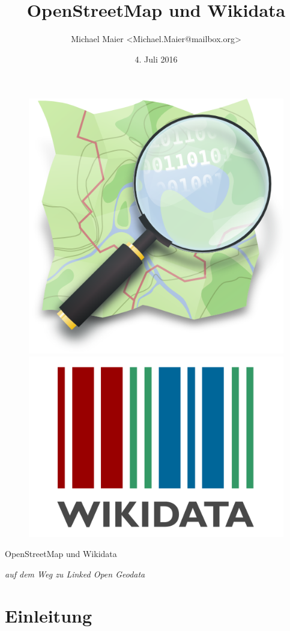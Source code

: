 \documentclass{beamer}
\title{OpenStreetMap und Wikidata}
\author{Michael Maier \textless Michael.Maier@mailbox.org\textgreater}
\date{4. Juli 2016}
\begin{document}

\begin{frame} 


\begin{figure}
  \centering
  \includegraphics[width=.4\textwidth]{mag_map.png}\includegraphics[width=.5\textwidth]{Wikidata-logo-en.pdf}
\end{figure}

\begin{center}
\Huge{OpenStreetMap und Wikidata\\}
\end{center}

\begin{center}
\Large{\emph{auf dem Weg zu Linked Open Geodata}}
\end{center}

\end{frame}


\section{Einleitung}
\end{document}
